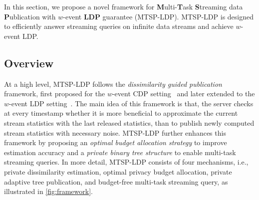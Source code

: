 \documentclass[acmsmall]{acmart}
\begin{document}
In this section, we propose a novel framework for \textbf{M}ulti-\textbf{T}ask
\textbf{S}treaming data \textbf{P}ublication with $w$-event \textbf{LDP}
guarantee (MTSP-LDP).
MTSP-LDP is designed to efficiently answer streaming queries on infinite data
streams and achieve $w$-event LDP.



\subsection{Overview}

At a high level, MTSP-LDP follows the \emph{dissimilarity guided publication}
framework, first proposed for the $w$-event CDP setting~\cite{Kellaris2014} and
later extended to the $w$-event LDP setting~\cite{Ren2022}.
The main idea of this framework is that, the server checks at every timestamp
whether it is more beneficial to approximate the current stream statistics with
the last released statistics, than to publish newly computed stream statistics
with necessary noise.
MTSP-LDP further enhances this framework by proposing an \emph{optimal budget
  allocation strategy} to improve estimation accuracy and a \emph{private binary
  tree structure} to enable multi-task streaming queries.
In more detail, MTSP-LDP consists of four mechanisms, i.e., private
dissimilarity estimation, optimal privacy budget allocation, private adaptive
tree publication, and budget-free multi-task streaming query, as illustrated in
\cref{fig:framework}.
\end{document}
